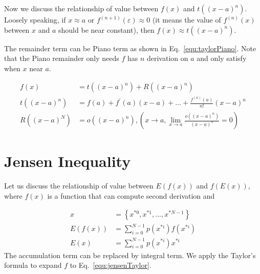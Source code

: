 \documentclass[runningheads,openany]{xhlPaper}
\begin{document}
Now we discuss the relationship of value between $f\left( x \right)$ and $t\left( {{{\left( {x - a} \right)}^n}} \right)$. Loosely speaking, if $x \approx a$ or ${{f^{(n + 1)}}\left( \varepsilon  \right)} \approx  0$ (it means the value of $f^{\left(n\right)}\left(x\right)$ between $x$ and $a$ should be near constant), then $f\left( x \right) \approx t\left( {{{\left( {x - a} \right)}^n}} \right)$.

The remainder term can be Piano term as shown in Eq.~\ref{equ:taylorPiano}. Note that the Piano remainder only needs $f$ has $n$ derivation on $a$ and only satisfy when $x$ near $a$.

\begin{equation}
\label{equ:taylorPiano}
\begin{aligned}
f\left( x \right) &= t\left( {{{\left( {x - a} \right)}^n}} \right) + R\left( {{{\left( {x - a} \right)}^n}} \right)\\
t\left( {{{\left( {x - a} \right)}^n}} \right) &= f\left( a \right) + {f^{'}}\left( a \right)\left( {x - a} \right) + ... + \frac{{{f^{(n)}}\left( a \right)}}{{n!}}{\left( {x - a} \right)^n}\\
R\left( {{{\left( {x - a} \right)}^N}} \right) &= o\left( {{{\left( {x - a} \right)}^n}} \right),\left( {x \to a,\mathop {\lim }\limits_{x \to a} \frac{{o\left( {{{\left( {x - a} \right)}^n}} \right)}}{{{{\left( {x - a} \right)}^n}}} = 0} \right)
\end{aligned}
\end{equation}

\section{Jensen Inequality}
Let us discuss the relationship of value between $E\left( {f\left( x \right)} \right)$ and $f\left( {E\left( x \right)} \right)$, where $f\left(x\right)$ is a function that can compute second derivation and 

\begin{displaymath}
\begin{aligned}
x &= \left\{ {{x^{*0}},{x^{*1}},...,{x^{*N - 1}}} \right\}\\
E\left( {f\left( x \right)} \right) &= \sum\limits_{i = 0}^{N - 1} {p\left( {{x^{*i}}} \right)f\left( {{x^{*i}}} \right)} \\
E\left( x \right) &= \sum\limits_{i = 0}^{N - 1} {p\left( {{x^{*i}}} \right){x^{*i}}} 
\end{aligned}
\end{displaymath}
The accumulation term can be replaced by integral term. We apply the Taylor's formula to expand $f$ to Eq.~\ref{equ:jensenTaylor}.
\end{document}

